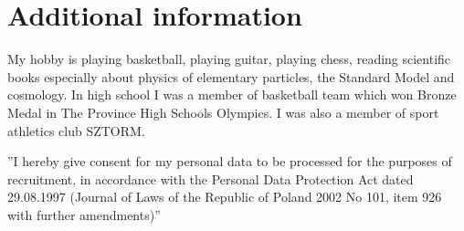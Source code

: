 \documentclass[a4paper,12pt]{article}
\begin{document}
\section{Additional information}
	My hobby is playing basketball, playing guitar, playing chess, reading scientific books especially about
	physics of elementary particles, the Standard Model and cosmology. In high school I was a member of basketball
	team which won Bronze Medal in The Province High Schools Olympics. I was also a member of sport athletics club SZTORM.
\vfill{}

\begin{center}
{\scriptsize
	''I hereby give consent for my personal data to be processed for the purposes of recruitment,
	in accordance with the Personal Data Protection Act dated 29.08.1997
	(Journal of Laws of the Republic of Poland 2002 No 101, item 926 with further amendments)''}
\end{center}
\end{document}
